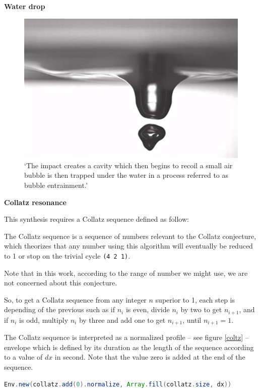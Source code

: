 \noindent  \textbf{
  Water drop }
  
\label{wd}

\smallskip

\begin{figure}[H]
\begin{center}
\includegraphics[width=0.65\linewidth]{img/3187} 
\caption{`The impact creates a cavity which then begins to recoil a small air bubble is then trapped under the water in a process referred to as bubble entrainment.' \citep{sdw}}
\label{dropwater}
\end{center}
\end{figure}

\noindent \textbf{
  Collatz resonance }

\label{colres}

\smallskip
This synthesis requires a Collatz sequence defined as follow:

{The Collatz sequence is a sequence of numbers relevant to the Collatz conjecture, which theorizes that any number using this algorithm will eventually be reduced to 1 or stop on the trivial cycle \texttt{(4 2 1)}.

Note that in this work, according to the range of number we might use, we are not concerned about this conjecture.

So, to get a Collatz sequence from any integer $n$ superior to 1, each step is depending of the previous such as if $n_i$ is even, divide $n_i$ by two to get $n_{i+1}$, and if $n_i$ is odd, multiply $n_i$ by three and add one to get $n_{i+1}$, until $n_{i+1}=1$. 
} 


The Collatz sequence is interpreted as a normalized profile -- see figure \ref{coltz} -- envelope which is defined by its duration as the length of the sequence according to a value of $dx$ in second. Note that the value zero is added at the end of the sequence.
\begin{lstlisting}[basicstyle=\footnotesize\ttfamily,language=Java]
Env.new(collatz.add(0).normalize, Array.fill(collatz.size, dx))
\end{lstlisting} 

